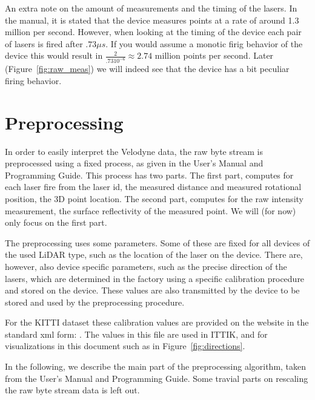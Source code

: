 \documentclass[english]{article}
\begin{document}
An extra note on the amount of measurements and the timing of the lasers. In the
manual, it is stated that the device measures points at a rate of around 1.3 million
per second. However, when looking at the timing of the device each pair of
lasers is fired after $.73 \mu s$. If you would assume a monotic firig behavior
of the device this would result in $\frac{2}{.73 10^{-6}} \approx 2.74$ million
points per second. Later (Figure~\ref{fig:raw_meas}) we will indeed see that the
device has a bit peculiar firing behavior.

\section{Preprocessing}
\label{sec:preproc}
In order to easily interpret the Velodyne data, the raw byte stream is
preprocessed using a fixed process, as given in the User's Manual and
Programming Guide. This process has two parts. The first part, computes for
each laser fire from the laser id, the measured distance and measured
rotational position, the 3D point location. The second part, computes
for the raw intensity measurement, the surface reflectivity of the
measured point. We will (for now) only focus on the first part.

The preprocessing uses some parameters. Some of these are fixed for all
devices of the used LiDAR type, such as the location of the laser on the
device. There are, however, also device specific parameters, such as the
precise direction of the lasers, which are determined in the factory
using a specific calibration procedure and stored on the device. These
values are also transmitted by the device to be stored and used by the
preprocessing procedure.

For the KITTI dataset these calibration values are provided on the
website in the standard xml form:
. The values in
this file are used in ITTIK, and for visualizations in this document
such as in Figure~\ref{fig:directions}.

In the following, we describe the main part of the preprocessing
algorithm, taken from the User's Manual and Programming Guide. Some
travial parts on rescaling the raw byte stream data is left out.
\end{document}
